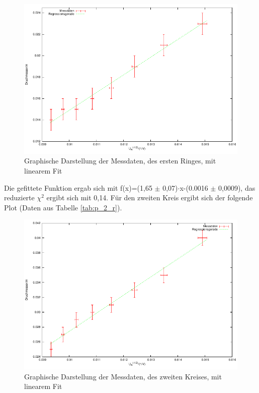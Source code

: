 \documentclass[12pt,a4paper]{article}
\begin{document}
\begin{figure}[H] 
  \centering
    \includegraphics[scale = 1]{kreis_1.pdf}
  	\caption[Graphische Darstellung der Messdaten, des ersten Ringes, mit linearem Fit]{Graphische Darstellung der Messdaten, des ersten Ringes, mit linearem Fit}
  \label{fig:plot_1}
\end{figure}

Die gefittete Funktion ergab sich mit f(x)=(1,65 $\pm$ 0,07)$\cdot$x-(0.0016 $\pm$ 0,0009), das reduzierte $\chi^2$ ergibt sich mit 0,14.
Für den zweiten Kreis ergibt sich der folgende Plot (Daten aus Tabelle \ref{tab:p_2_r}).

\begin{figure}[H] 
  \centering
    \includegraphics[scale = 1]{kreis_2.pdf}
  	\caption[Graphische Darstellung der Messdaten, des zweiten Kreises, mit linearem Fit]{Graphische Darstellung der Messdaten, des zweiten Kreises, mit linearem Fit}
  \label{fig:plot_1}
\end{figure}
\end{document}
